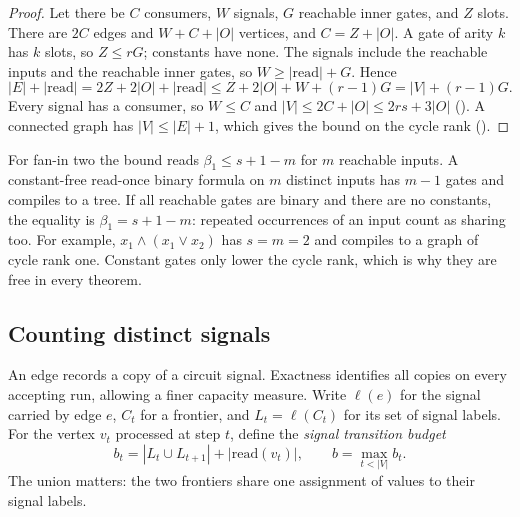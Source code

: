 \documentclass[11pt]{article}
\newcommand{\leanrefs}[1]{{\unskip\nobreak\hfil\penalty50\hskip1em\null\nobreak\hfil
  {\normalfont\small #1}\parfillskip=0pt\finalhyphendemerits=0\par}}
\newcommand{\leanref}[1]{\leanrefs{\lean{#1}}}
\theoremstyle{plain}
\theoremstyle{definition}
\theoremstyle{remark}
\newcommand{\card}[1]{\lvert #1\rvert}
\newcommand{\rd}{\mathrm{read}}
\begin{document}

\begin{proof}
Let there be $C$ consumers, $W$ signals, $G$ reachable inner gates, and $Z$ slots. There are
$2C$ edges and $W + C + \card O$ vertices, and $C = Z + \card O$. A gate of arity $k$ has $k$
slots, so $Z \le rG$; constants have none. The signals include the reachable inputs and the
reachable inner gates, so $W \ge \card{\rd} + G$. Hence
\[
  \card E + \card{\rd} = 2Z + 2\card O + \card{\rd} \le Z + 2\card O + W + (r-1)G
  = \card V + (r-1) G .
\]
Every signal has a consumer, so $W \le C$ and $\card V \le 2C + \card O \le 2rs + 3\card O$
(). A connected graph has $\card V \le \card E + 1$, which
gives the bound on the cycle rank ().
\end{proof}

For fan-in two the bound reads $\beta_1 \le s + 1 - m$ for $m$ reachable inputs. A constant-free
read-once binary formula on $m$ distinct inputs has $m-1$ gates and compiles to a tree. If all
reachable gates are binary and there are no constants, the equality is
$\beta_1=s+1-m$: repeated occurrences of an input count as sharing too. For example,
$x_1\wedge(x_1\vee x_2)$ has $s=m=2$ and compiles to a graph of cycle rank one. Constant gates
only lower the cycle rank, which is why they are free in every theorem.

\subsection{Counting distinct signals}
\label{sec:signals}

An edge records a copy of a circuit signal. Exactness identifies all copies on every accepting
run, allowing a finer capacity measure. Write $\ell(e)$ for the signal carried by edge $e$,
$C_t$ for a frontier, and $L_t=\ell(C_t)$ for its set of signal labels. For the vertex $v_t$
processed at step $t$, define the \emph{signal transition budget}
\[
  b_t=|L_t\cup L_{t+1}|+|\rd(v_t)|,\qquad b=\max_{t<|V|}b_t.
\]
The union matters: the two frontiers share one assignment of values to their signal labels.
\end{document}
